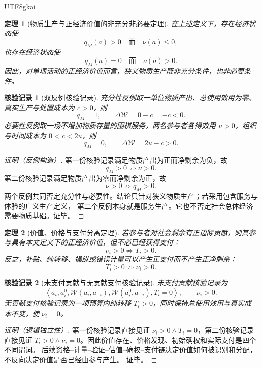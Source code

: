\documentclass[12pt,a4paper,openany]{report}
\newtheorem{theorem}{定理}[chapter]
\newtheorem{Certificate}{核验记录}[chapter]
\newcommand{\Tuple}[1]{\left\langle #1\right\rangle}
\begin{document}
\begin{CJK*}{UTF8}{gkai}
\begin{theorem}[物质生产与正经济价值的非充分非必要定理]
\label{thm:material-production-neither}
在上述定义下，存在经济状态使
\[
  q_M(a)>0
  \quad\text{而}\quad
  \nu(a)\le0,
\]
也存在经济状态使
\[
  q_M(a)=0
  \quad\text{而}\quad
  \nu(a)>0.
\]
因此，对单项活动的正经济价值而言，狭义物质生产既非充分条件，也非必要条件。
\end{theorem}

\begin{Certificate}[双反例核验记录]
充分性反例取一单位物质产出、总使用效用为零、真实生产与处置成本为 \(c>0\)，则
\[
  q_M=1,\qquad \Delta\mathcal W=0-c=-c<0.
\]
必要性反例取一场不增加物质存量的围棋服务，两名参与者各得效用 \(u>0\)，组织与时间成本为
\(0<c<2u\)，则
\[
  q_M=0,\qquad \Delta\mathcal W=2u-c>0.
\]
\end{Certificate}

\begin{proof}[证明（反例构造）]
第一份核验记录满足物质产出为正而净剩余为负，故
\[
  q_M>0\not\Longrightarrow \nu>0.
\]
第二份核验记录满足物质产出为零而净剩余为正，故
\[
  \nu>0\not\Longrightarrow q_M>0.
\]
两个反例共同否定充分性与必要性。结论只针对狭义物质生产；若采用包含服务与体验的广义生产定义，
第二个反例本身就是服务生产。它也不否定社会总体经济需要物质基础。证毕。
\end{proof}

\begin{theorem}[价值、价格与支付分离定理]
\label{thm:value-price-payment-separation}
若参与者对社会剩余有正边际贡献，则其参与具有本文定义下的正经济价值，但不必已经获得支付：
\[
  \nu_i>0\not\Longrightarrow T_i>0.
\]
反之，补贴、纯转移、操纵或错误计量可以产生正支付而不产生正净剩余：
\[
  T_i>0\not\Longrightarrow \nu_i>0.
\]
\end{theorem}

\begin{Certificate}[未支付贡献与无贡献支付核验记录]
未支付贡献核验记录为
\[
  \Tuple{a_i,a_i^0,\mathcal W(a_i,a_{-i}),\mathcal W(a_i^0,a_{-i}),T_i=0},
  \qquad \nu_i>0.
\]
无贡献支付核验记录为一项预算内纯转移 \(T_i>0\)，同时保持总使用效用与真实成本不变，使
\(\nu_i=0\)。
\end{Certificate}

\begin{proof}[证明（逻辑独立性）]
第一份核验记录直接见证 \(\nu_i>0\wedge T_i=0\)，第二份核验记录直接见证
\(T_i>0\wedge\nu_i=0\)。因此价值存在、价格发现、初始确权和实际支付是四个不同谓词。
后续资格--计量--验证--估值--确权--支付链决定价值如何被识别和分配，不反向决定价值是否已经由参与产生。
证毕。
\end{proof}


\end{CJK*}
\end{document}
